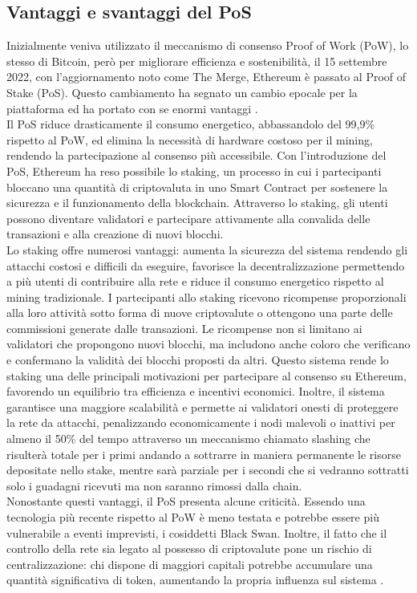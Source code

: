 \subsection{Vantaggi e svantaggi del PoS}
Inizialmente veniva utilizzato il meccanismo di consenso Proof of Work (PoW), lo stesso di Bitcoin, però per migliorare efficienza e sostenibilità, il 15 settembre 2022, con l’aggiornamento noto come The Merge, Ethereum è passato al Proof of Stake (PoS). 
Questo cambiamento ha segnato un cambio epocale per la piattaforma ed ha portato con se enormi vantaggi \cite{crypto_gateway_video}.
\\Il PoS riduce drasticamente il consumo energetico, abbassandolo del 99,9\% rispetto al PoW, ed elimina la necessità di hardware costoso per il mining, rendendo la partecipazione al consenso più accessibile.
Con l’introduzione del PoS, Ethereum ha reso possibile lo staking, un processo in cui i partecipanti bloccano una quantità di criptovaluta in uno Smart Contract per sostenere la sicurezza e il funzionamento della blockchain. Attraverso lo staking, gli utenti possono diventare validatori e partecipare attivamente alla convalida delle transazioni e alla creazione di nuovi blocchi.
\\Lo staking offre numerosi vantaggi: aumenta la sicurezza del sistema rendendo gli attacchi costosi e difficili da eseguire, favorisce la decentralizzazione permettendo a più utenti di contribuire alla rete e riduce il consumo energetico rispetto al mining tradizionale. 
I partecipanti allo staking ricevono ricompense proporzionali alla loro attività sotto forma di nuove criptovalute o ottengono una parte delle commissioni generate dalle transazioni.
Le ricompense non si limitano ai validatori che propongono nuovi blocchi, ma includono anche coloro che verificano e confermano la validità dei blocchi proposti da altri. Questo sistema rende lo staking una delle principali motivazioni per partecipare al consenso su Ethereum, favorendo un equilibrio tra efficienza e incentivi economici.
Inoltre, il sistema garantisce una maggiore scalabilità e permette ai validatori onesti di proteggere la rete da attacchi, penalizzando economicamente i nodi malevoli o inattivi per almeno il 50\% del tempo attraverso un meccanismo chiamato slashing che risulterà totale per i primi andando a sottrarre in maniera permanente le risorse depositate nello stake, mentre sarà parziale per i secondi che si vedranno sottratti solo i guadagni ricevuti ma non saranno rimossi dalla chain.
\\Nonostante questi vantaggi, il PoS presenta alcune criticità. Essendo una tecnologia più recente rispetto al PoW è meno testata e potrebbe essere più vulnerabile a eventi imprevisti, i cosiddetti Black Swan. Inoltre, il fatto che il controllo della rete sia legato al possesso di criptovalute pone un rischio di centralizzazione: chi dispone di maggiori capitali potrebbe accumulare una quantità significativa di token, aumentando la propria influenza sul sistema \cite{kraken_docsend}.
